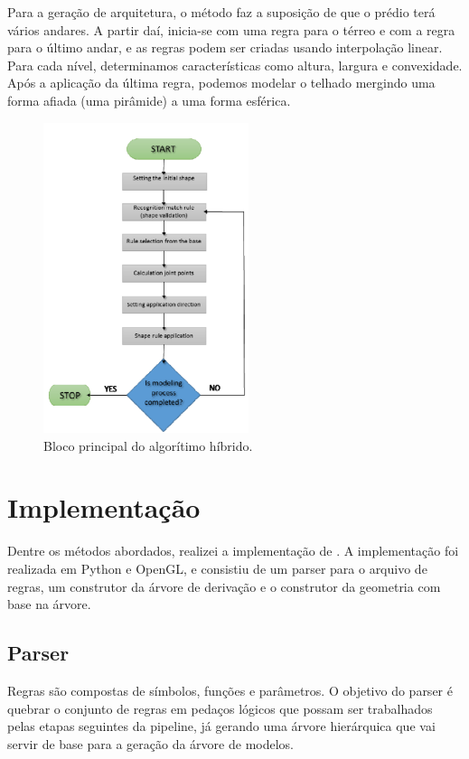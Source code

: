 \documentclass[a4paper, 11pt]{article}
\begin{document}
    Para a geração de arquitetura, o método faz a suposição de que o prédio terá vários andares. A partir daí, inicia-se com uma regra para o térreo e com a regra para o último andar, e as regras podem ser criadas usando interpolação linear. Para cada nível, determinamos características como altura, largura e convexidade. Após a aplicação da última regra, podemos modelar o telhado mergindo uma forma afiada (uma pirâmide) a uma forma esférica. 

    \begin{figure}[!ht]
        \centering
        \includegraphics[width=60mm]{imgs/hybridblock.png}
        \caption{Bloco principal do algorítimo híbrido.}
        \label{fig:hybridblock}
    \end{figure}    

    \section{Implementação} \label{sec:impl}
    Dentre os métodos abordados, realizei a implementação de \cite{Muller:2006:PMB:1141911.1141931}. A implementação foi realizada em Python e OpenGL, e consistiu de um parser para o arquivo de regras, um construtor da árvore de derivação e o construtor da geometria com base na árvore.

        \subsection{Parser}
        Regras são compostas de símbolos, funções e parâmetros. O objetivo do parser é quebrar o conjunto de regras em pedaços lógicos que possam ser trabalhados pelas etapas seguintes da pipeline, já gerando uma árvore hierárquica que vai servir de base para a geração da árvore de modelos.
\end{document}
